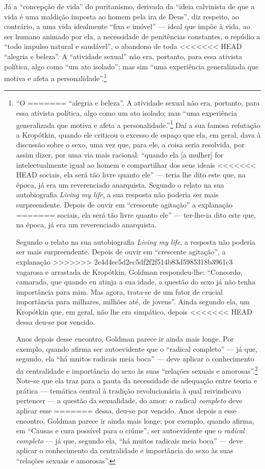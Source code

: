 Já a ``concepção de vida'' do
puritanismo, derivada da ``ideia calvinista de que a vida é uma maldição
imposta ao homem pela ira de Deus'', diz respeito, ao contrário, a uma
vida idealmente ``fixa e imóvel'' --- ideal que impõe à vida, ao
ser humano animado por ela, a necessidade de penitências constantes, o
repúdio a ``todo impulso natural e saudável'', o abandono de toda
<<<<<<< HEAD
``alegria e beleza''. A ``atividade sexual'' não era, portanto, para
essa ativista política, algo como ``um ato isolado''; mas sim ``uma
experiência generalizada que motiva e afeta a personalidade''.\footnote{``O
=======
``alegria e beleza''. A atividade sexual não era, portanto, para
essa ativista política, algo como um ato isolado; mas ``uma
experiência generalizada que motiva e afeta a personalidade.''\footnote{Ver capítulo ``O
>>>>>>> 2e4d4ec5d2ec5df2f2f514b83d5985318b3961c3
elemento sexual da vida''.} Daí a sua famosa refutação a Kropótkin,
quando ele criticou o excesso de espaço que ela, em geral, dava à
discussão sobre o sexo, uma vez que, para ele, a coisa seria resolvida,
por assim dizer, por uma via mais racional: ``quando ela {[}a mulher{]}
for intelectualmente igual ao homem e compartilhar dos seus ideais
<<<<<<< HEAD
sociais, ela será tão livre quanto ele'' --- teria lhe dito este que, na
época, já era um reverenciado anarquista. Segundo o relato na sua
autobiografia \emph{Living my life}, a sua resposta não poderia ser mais
surpreendente. Depois de ouvir em ``crescente agitação'' a explanação
=======
sociais, ela será tão livre quanto ele'' --- ter-lhe-ia dito este que, na
época, já era um reverenciado anarquista. 

Segundo o relato na sua
autobiografia \textit{Living my life}, a resposta não poderia ser mais
surpreendente. Depois de ouvir em ``crescente agitação'', a explanação
>>>>>>> 2e4d4ec5d2ec5df2f2f514b83d5985318b3961c3
vagarosa e arrastada de Kropótkin, Goldman respondeu-lhe: ``Concordo,
camarada, que quando eu atinja a sua idade, a questão do sexo já não
tenha importância para mim. Mas agora, trata-se de um fator de
crucial importância para milhares, milhões até, de jovens''. Ainda
segundo ela, um Kropótkin que, em geral, não lhe era simpático, depois
<<<<<<< HEAD
dessa deu-se por vencido.

Anos depois desse encontro, Goldman parece
ir ainda mais longe. Por exemplo, quando afirma
ser autoevidente que o ``radical completo'' ---
já que, segundo, ela ``há muitos radicais meia boca'' --- deve aplicar o
conhecimento da centralidade e importância do sexo às suas ``relações
sexuais e amorosas''.\footnote{Ver ``Causas e cura
possível para o ciúme'', p.\,\pageref{radical}.} Note-se que ela traz para a pauta da
necessidade de adequação entre teoria e prática --- temática central à
tradição revolucionária à qual reivindicava pertencer --- a questão
da sexualidade, do amor: o radical \emph{completo} deve aplicar esse
=======
dessa, deu-se por vencido. Anos depois a esse encontro, Goldman parece
ir ainda mais longe; por exemplo, quando afirma, em ``Causas e cura
possível para o ciúme'', ser autoevidente que o \textit{radical completo} ---
já que, segundo ela, ``há muitos radicais meia boca'' --- deve aplicar o
conhecimento da centralidade e importância do sexo às suas ``relações
sexuais e amorosas''. 

}
